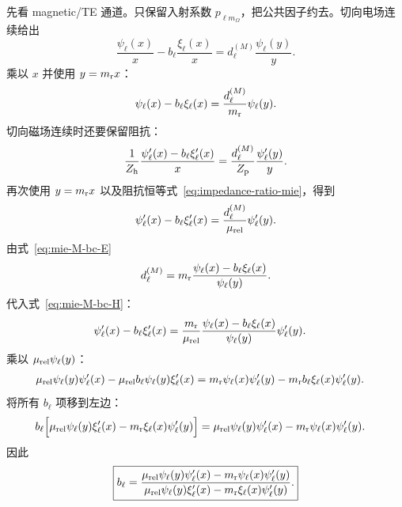 先看 magnetic/TE 通道。只保留入射系数
$p_{\ell m_{\Omega}}$，把公共因子约去。切向电场连续给出
\begin{equation}
\frac{\psi_\ell(x)}{x}
-b_\ell\frac{\xi_\ell(x)}{x}
=d_\ell^{(M)}\frac{\psi_\ell(y)}{y}.
\end{equation}
乘以 $x$ 并使用 $y=m_{\rm r}x$：
\begin{equation}
\psi_\ell(x)-b_\ell\xi_\ell(x)
=\frac{d_\ell^{(M)}}{m_{\rm r}}\psi_\ell(y).
\label{eq:mie-M-bc-E}
\end{equation}
切向磁场连续时还要保留阻抗：
\begin{equation}
\frac{1}{Z_{\rm h}}
\frac{\psi_\ell'(x)-b_\ell\xi_\ell'(x)}{x}
=
\frac{d_\ell^{(M)}}{Z_{\rm p}}
\frac{\psi_\ell'(y)}{y}.
\end{equation}
再次使用 $y=m_{\rm r}x$ 以及阻抗恒等式~\eqref{eq:impedance-ratio-mie}，得到
\begin{equation}
\psi_\ell'(x)-b_\ell\xi_\ell'(x)
=\frac{d_\ell^{(M)}}{\mu_{\rm rel}}
\psi_\ell'(y).
\label{eq:mie-M-bc-H}
\end{equation}
由式~\eqref{eq:mie-M-bc-E}
\begin{equation}
d_\ell^{(M)}
=m_{\rm r}
\frac{\psi_\ell(x)-b_\ell\xi_\ell(x)}
{\psi_\ell(y)}.
\end{equation}
代入式~\eqref{eq:mie-M-bc-H}：
\begin{align}
\psi_\ell'(x)-b_\ell\xi_\ell'(x)
&=\frac{m_{\rm r}}{\mu_{\rm rel}}
\frac{\psi_\ell(x)-b_\ell\xi_\ell(x)}
{\psi_\ell(y)}\psi_\ell'(y).
\end{align}
乘以 $\mu_{\rm rel}\psi_\ell(y)$：
\begin{align}
\mu_{\rm rel}\psi_\ell(y)\psi_\ell'(x)
-\mu_{\rm rel}b_\ell\psi_\ell(y)\xi_\ell'(x)
={}&
 m_{\rm r}\psi_\ell(x)\psi_\ell'(y)
-m_{\rm r}b_\ell\xi_\ell(x)\psi_\ell'(y).
\end{align}
将所有 $b_\ell$ 项移到左边：
\begin{align}
b_\ell\Bigl[
\mu_{\rm rel}\psi_\ell(y)\xi_\ell'(x)
-m_{\rm r}\xi_\ell(x)\psi_\ell'(y)
\Bigr]
={}&
\mu_{\rm rel}\psi_\ell(y)\psi_\ell'(x)
-m_{\rm r}\psi_\ell(x)\psi_\ell'(y).
\end{align}
因此
\begin{equation}
\boxed{
b_\ell=
\frac{
\mu_{\rm rel}\psi_\ell(y)\psi_\ell'(x)
-m_{\rm r}\psi_\ell(x)\psi_\ell'(y)
}{
\mu_{\rm rel}\psi_\ell(y)\xi_\ell'(x)
-m_{\rm r}\xi_\ell(x)\psi_\ell'(y)
}.}
\label{eq:mie-b-standard}
\end{equation}

